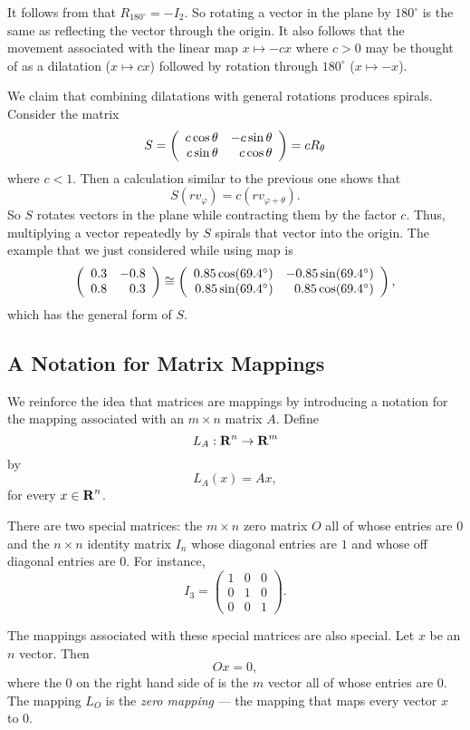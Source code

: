 It follows from  that $R_{180^\circ} = -I_2$.  So rotating a
vector in the plane by $180^\circ$ is the same as reflecting the vector
through the origin.  It also follows that the movement associated with the
linear map $x\mapsto -cx$ where $c>0$ may be thought of as a dilatation
($x\mapsto cx$) followed by rotation through $180^\circ$ ($x\mapsto -x$).

We claim that combining dilatations with general rotations produces spirals.  
Consider the matrix
\[
S = \left(\begin{array}{rr} c\cos\theta & -c\sin\theta\\ c\sin\theta &c\cos\theta\end{array}\right) = cR_\theta
\]
where $c<1$.  Then a calculation similar to the previous one shows that
\[
S(rv_\varphi) = c(rv_{\varphi+\theta}).
\]
So $S$ rotates vectors in the plane while contracting them by
the factor $c$.  Thus, multiplying a vector repeatedly by $S$ 
spirals that vector into the origin.  The example that we just 
considered while using {\sf map} is
\[
\left(\begin{array}{rr} 0.3 & -0.8\\ 0.8 &0.3\end{array}\right)\cong\left(\begin{array}{rr} 0.85\cos(69.4^\circ) & -0.85\sin(69.4^\circ)\\ 0.85\sin(69.4^\circ) &0.85\cos(69.4^\circ)\end{array}\right),
\]
which has the general form of $S$.

\subsection*{A Notation for Matrix Mappings}

We reinforce the idea that matrices are mappings by introducing a notation 
for the mapping associated with an $m\times n$ matrix $A$.  Define
\[
L_A:\mbox{$\bf{R}$}^n\to\mbox{$\bf{R}$}^m
\]
by
\[
L_A(x) = Ax,
\]
for every $x\in\mbox{$\bf{R}$}^n$.

There are two special matrices:  the $m\times n$ zero matrix 
 $O$ all of whose entries are $0$ and the 
$n\times n$ identity matrix  $I_n$ whose diagonal 
entries are $1$ and whose off diagonal entries are $0$.  For instance,
\[
	I_3 = \left(
\begin{array}{rrr}
 1 & 0 & 0  \\
 0 & 1 & 0  \\
 0 & 0 & 1
\end{array}
\right).
\]

The mappings associated with these special matrices are also special.  
Let $x$ be an $n$ vector.  Then
\begin{equation} \label{multby0}
Ox=0,
\end{equation}
where the $0$ on the right hand side of  is the $m$
vector all of whose entries are $0$.  The mapping $L_O$ is the 
{\em zero mapping\/}  --- the mapping 
that maps every vector $x$ to $0$.

